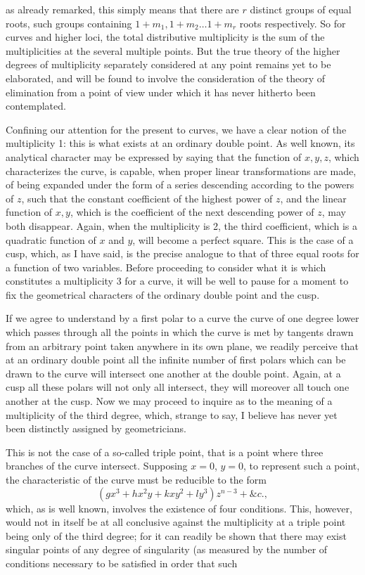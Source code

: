 \documentclass[11pt]{article}
\newcommand{\sourcepage}[1]{\marginpar{\scriptsize p.~#1}}
\begin{document}
\sourcepage{371}
as already remarked, this simply means that there are $r$ distinct groups of equal roots, such groups containing $1+m_1,1+m_2\ldots1+m_r$ roots respectively. So for curves and higher loci, the total distributive multiplicity is the sum of the multiplicities at the several multiple points. But the true theory of the higher degrees of multiplicity separately considered at any point remains yet to be elaborated, and will be found to involve the consideration of the theory of elimination from a point of view under which it has never hitherto been contemplated.

Confining our attention for the present to curves, we have a clear notion of the multiplicity 1: this is what exists at an ordinary double point. As well known, its analytical character may be expressed by saying that the function of $x,y,z$, which characterizes the curve, is capable, when proper linear transformations are made, of being expanded under the form of a series descending according to the powers of $z$, such that the constant coefficient of the highest power of $z$, and the linear function of $x,y$, which is the coefficient of the next descending power of $z$, may both disappear. Again, when the multiplicity is 2, the third coefficient, which is a quadratic function of $x$ and $y$, will become a perfect square. This is the case of a cusp, which, as I have said, is the precise analogue to that of three equal roots for a function of two variables. Before proceeding to consider what it is which constitutes a multiplicity 3 for a curve, it will be well to pause for a moment to fix the geometrical characters of the ordinary double point and the cusp.

If we agree to understand by a first polar to a curve the curve of one degree lower which passes through all the points in which the curve is met by tangents drawn from an arbitrary point taken anywhere in its own plane, we readily perceive that at an ordinary double point all the infinite number of first polars which can be drawn to the curve will intersect one another at the double point. Again, at a cusp all these polars will not only all intersect, they will moreover all touch one another at the cusp. Now we may proceed to inquire as to the meaning of a multiplicity of the third degree, which, strange to say, I believe has never yet been distinctly assigned by geometricians.

This is not the case of a so-called triple point, that is a point where three branches of the curve intersect. Supposing $x=0$, $y=0$, to represent such a point, the characteristic of the curve must be reducible to the form
\[
(gx^3+hx^2y+kxy^2+ly^3)z^{n-3}+\&c.,
\]
which, as is well known, involves the existence of four conditions. This, however, would not in itself be at all conclusive against the multiplicity at a triple point being only of the third degree; for it can readily be shown that there may exist singular points of any degree of singularity (as measured by the number of conditions necessary to be satisfied in order that such
\end{document}
